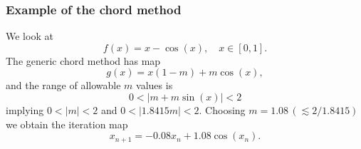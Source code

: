 \documentclass{beamer}
\begin{document}
\begin{frame}
  \frametitle{Example of the chord method}

  We look at
  \begin{equation*}
    f(x) = x - \cos(x), \quad x \in [0, 1].
  \end{equation*}\pause
  The generic chord method has map
  \begin{equation*}
    g(x) = x ( 1 - m ) + m \cos(x),
  \end{equation*}
  and the range of allowable $m$ values is
  \begin{equation*}
    0 <  | m + m \sin(x) | < 2
  \end{equation*}
  implying $0<|m|<2$ and $0<|1.8415 m|<2$. \pause Choosing $m = 1.08 \,
  (\lesssim 2 / 1.8415)$ we obtain the iteration map
  \begin{equation*}
    x_{n+1} = -0.08 x_n + 1.08 \cos(x_n).
  \end{equation*}

\end{frame}
\end{document}
